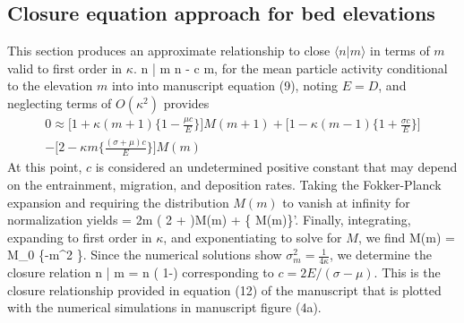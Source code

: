 \subsection{Closure equation approach for bed elevations}
This section produces an approximate relationship to close $\langle n | m \rangle$ in terms of $m$ valid to first order in $\kappa$.
\be \langle n | m \rangle \approx \langle n \rangle  - \kappa c m,\ee
for the mean particle activity conditional to the elevation $m$ into into manuscript equation (9), noting $E=D$, and neglecting terms of $O(\kappa^2)$ provides 
\begin{multline} 0 \approx \Big[ 1+\kappa(m+1)\Big\{ 1-\frac{\mu c}{E}\Big\}\Big]M(m+1) + \Big[1-\kappa(m-1)\Big\{1+\frac{\sigma c}{E}\Big\}\Big]\\-\Big[2-\kappa m\Big\{\frac{(\sigma+\mu)c}{E}\Big\}\Big]M(m)
\end{multline}
At this point, $c$ is considered an undetermined positive constant that may depend on the entrainment, migration, and deposition rates.
Taking the Fokker-Planck expansion and requiring the distribution $M(m)$ to vanish at infinity for normalization yields
 = 2\kappa m \Big( 2 + \Big)M(m) + \Big\{
M(m)\Big\}'.\ee
Finally, integrating, expanding to first order in $\kappa$, and exponentiating to solve for $M$, we find
\be M(m) = M_0 \exp\Big\{-\kappa m^2 \Big\}.\ee
Since the numerical solutions show $\sigma_m^2 = \frac{1}{4\kappa}$, we determine the closure relation
\be \langle n | m \rangle = \langle n \rangle\Big( 1-\Big) \ee
corresponding to $c=2E/(\sigma-\mu)$. This is the closure relationship provided in equation (12) of the manuscript that is plotted with the numerical simulations in manuscript figure (4a).